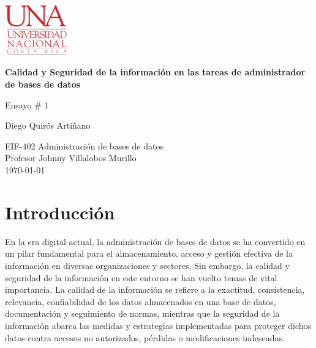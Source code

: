 \documentclass[12pt, article, natbib]{IEEEtran}
\begin{document}
\begin{titlepage}
	\includegraphics[width=0.2\textwidth]{../../../Files/logo-UNA blanco.png}      
   	\begin{changemargin}{4.5cm}{0cm}
       	\textbf{\Huge Calidad y Seguridad de la información en las tareas de administrador de bases de datos}

       	\vspace{0.2cm}
       	\LARGE Ensayo \# 1
            
       	\vspace{3cm}
		\Large
       	Diego Quirós Artiñano \\ 

       	\vspace{3cm}
       
		EIF-402 Administración de bases de datos \\
       	Profesor Johnny Villalobos Murillo \\
		       	
       	\vspace{3cm}
       	\today
	\end{changemargin}
\end{titlepage}

\onecolumn
    \renewcommand{\contentsname}{\large Índice \\ \hrulefill}
\newpage

\twocolumn
\onehalfspace
\section{Introducción}

En la era digital actual, la administración de bases de datos se ha convertido en un pilar fundamental para el almacenamiento, acceso y gestión efectiva de la información en diversas organizaciones y sectores. Sin embargo, la calidad y seguridad de la información en este entorno se han vuelto temas de vital importancia. La calidad de la información se refiere a la exactitud, consistencia, relevancia, confiabilidad de los datos almacenados en una base de datos, documentación y seguimiento de normas, mientras que la seguridad de la información abarca las medidas y estrategias implementadas para proteger dichos datos contra accesos no autorizados, pérdidas o modificaciones indeseadas.
\end{document}
